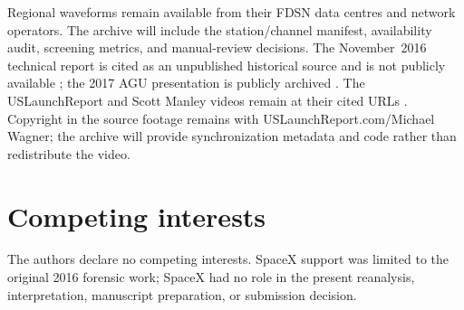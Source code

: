 \documentclass[]{seismica}
\begin{document}
Regional waveforms remain available from their FDSN data centres and network
operators. The archive will include the station/channel manifest, availability
audit, screening metrics, and manual-review decisions. The November~2016
technical report is cited as an unpublished historical source and is not
publicly available \citep{thompson_mcnutt_fireball_2016}; the 2017 AGU
presentation is publicly archived \citep{thompson_agu_falcon9_2017}. The USLaunchReport and
Scott Manley videos remain at their cited URLs
\citep{uslaunchreport_amos6_video_2016,manley_spacex_explosion_2016}. Copyright
in the source footage remains with USLaunchReport.com/Michael Wagner; the
archive will provide synchronization metadata and code rather than redistribute
the video.

\section*{Competing interests}

The authors declare no competing interests. SpaceX support was limited to the
original 2016 forensic work; SpaceX had no role in the present reanalysis,
interpretation, manuscript preparation, or submission decision.


\end{document}
